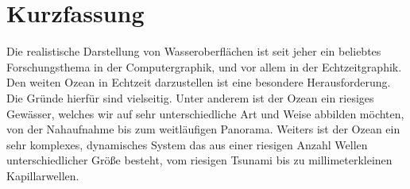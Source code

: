 \chapter*{Kurzfassung}

\textcolor{changed}{
Die realistische Darstellung von Wasseroberflächen ist seit jeher ein beliebtes Forschungsthema in der Computergraphik, und vor allem in
der Echtzeitgraphik. Den weiten Ozean in Echtzeit darzustellen ist
eine besondere Herausforderung. Die Gründe hierfür sind vielseitig.
Unter anderem ist der Ozean ein riesiges Gewässer, welches wir auf
sehr unterschiedliche Art und Weise abbilden möchten, von der Nahaufnahme
bis zum weitläufigen Panorama.
Weiters ist der Ozean ein sehr komplexes, dynamisches System das aus
einer riesigen Anzahl Wellen unterschiedlicher Größe besteht, vom
riesigen Tsunami bis zu millimeterkleinen Kapillarwellen.
}


